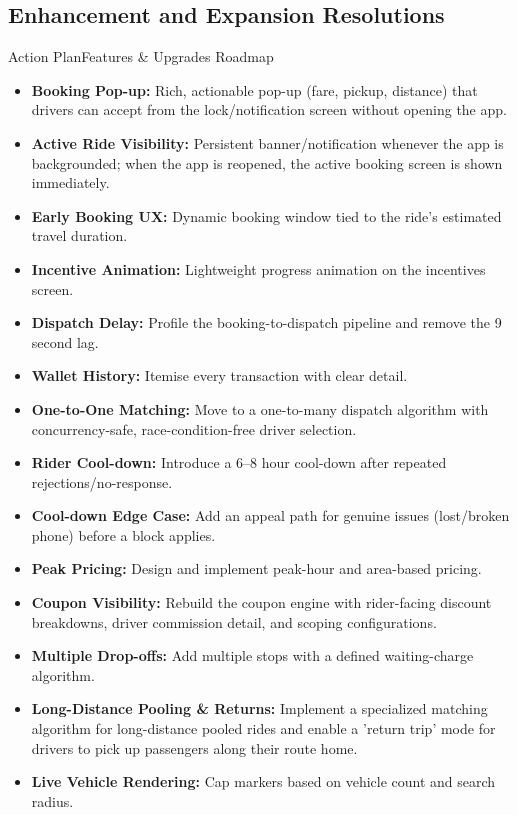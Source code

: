 \documentclass[11pt,a4paper]{article}
\begin{document}
\subsection{Enhancement and Expansion Resolutions}
\begin{recbox}{Action Plan}{Features \& Upgrades Roadmap}
\begin{itemize}
  \item \textbf{Booking Pop-up:} Rich, actionable pop-up (fare, pickup, distance) that drivers can accept from the lock/notification screen without opening the app.
  \item \textbf{Active Ride Visibility:} Persistent banner/notification whenever the app is backgrounded; when the app is reopened, the active booking screen is shown immediately.
  \item \textbf{Early Booking UX:} Dynamic booking window tied to the ride's estimated travel duration.
  \item \textbf{Incentive Animation:} Lightweight progress animation on the incentives screen.
  \item \textbf{Dispatch Delay:} Profile the booking-to-dispatch pipeline and remove the 9 second lag.
  \item \textbf{Wallet History:} Itemise every transaction with clear detail.
  \item \textbf{One-to-One Matching:} Move to a one-to-many dispatch algorithm with concurrency-safe, race-condition-free driver selection.
  \item \textbf{Rider Cool-down:} Introduce a 6--8 hour cool-down after repeated rejections/no-response.
  \item \textbf{Cool-down Edge Case:} Add an appeal path for genuine issues (lost/broken phone) before a block applies.
  \item \textbf{Peak Pricing:} Design and implement peak-hour and area-based pricing.
  \item \textbf{Coupon Visibility:} Rebuild the coupon engine with rider-facing discount breakdowns, driver commission detail, and scoping configurations.
  \item \textbf{Multiple Drop-offs:} Add multiple stops with a defined waiting-charge algorithm.
  \item \textbf{Long-Distance Pooling \& Returns:} Implement a specialized matching algorithm for long-distance pooled rides and enable a 'return trip' mode for drivers to pick up passengers along their route home.
  \item \textbf{Live Vehicle Rendering:} Cap markers based on vehicle count and search radius.

\end{itemize}
\end{recbox}
\end{document}

